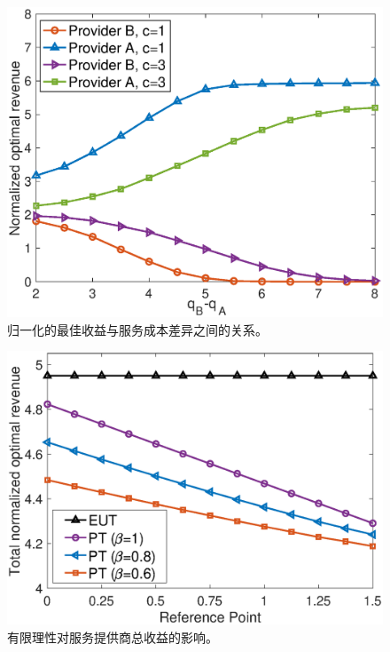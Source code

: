 \begin{figure}[htb]
\centering
\includegraphics[scale=0.53]{./pic/cost2.eps}
\vspace{-0.0cm}
\caption{归一化的最佳收益与服务成本差异之间的关系。}\label{fg:Fig3}
\end{figure}

\begin{figure}[htb]
\centering
\includegraphics[scale=0.53]{./pic/prospect2.eps}
\vspace{-0.0cm}
\caption{有限理性对服务提供商总收益的影响。}\label{fg:prospect}
\end{figure}

